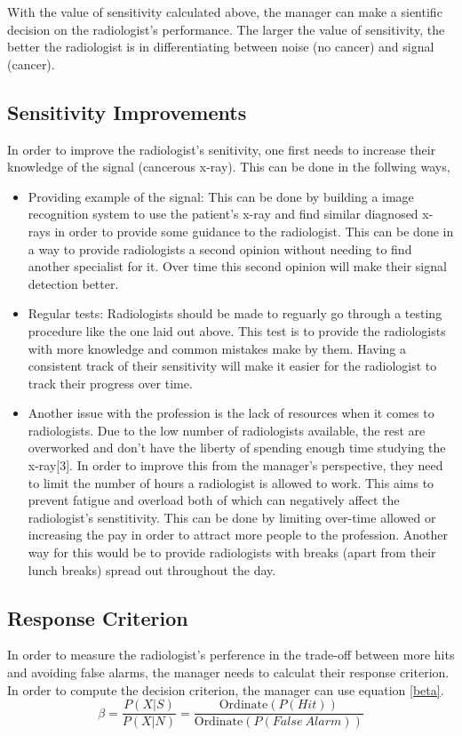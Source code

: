 \documentclass[12pt]{article}
\begin{document}
	With the value of sensitivity calculated above, the manager can make a sientific decision on the radiologist's performance. The larger the value of sensitivity, the better the radiologist is in differentiating between noise (no cancer) and signal (cancer).
	
	\subsection{Sensitivity Improvements}
	
	In order to improve the radiologist's senitivity, one first needs to increase their knowledge of the signal (cancerous x-ray). This can be done in the follwing ways,
	\begin{itemize}
		\item Providing example of the signal: This can be done by building a image recognition system to use the patient's x-ray and find similar diagnosed x-rays in order to provide some guidance to the radiologist. This can be done in a way to provide radiologists a second opinion without needing to find another specialist for it. Over time this second opinion will make their signal detection better.
		\item Regular tests: Radiologists should be made to reguarly go through a testing procedure like the one laid out above. This test is to provide the radiologists with more knowledge and common mistakes make by them. Having a consistent track of their sensitivity will make it easier for the radiologist to track their progress over time.
		\item Another issue with the profession is the lack of resources when it comes to radiologists. Due to the low number of radiologists available, the rest are overworked and don't have the liberty of spending enough time studying the x-ray[3]. In order to improve this from the manager's perspective, they need to limit the number of hours a radiologist is allowed to work. This aims to prevent fatigue and overload both of which can negatively affect the radiologist's senstitivity. This can be done by limiting over-time allowed or increasing the pay in order to attract more people to the profession. Another way for this would be to provide radiologists with breaks (apart from their lunch breaks) spread out throughout the day.
	\end{itemize}
	
	\subsection{Response Criterion}
	In order to measure the radiologist's perference in the trade-off between more hits and avoiding false alarms, the manager needs to calculat their response criterion. In order to compute the decision criterion, the manager can use equation \ref{beta}. 
	\begin{equation}
		\beta = \frac{P(X|S)}{P(X|N)} = \frac{\text{Ordinate}(P(Hit))}{\text{Ordinate}(P(False\ Alarm))}
		\label{beta}
	\end{equation}
	
\end{document}
